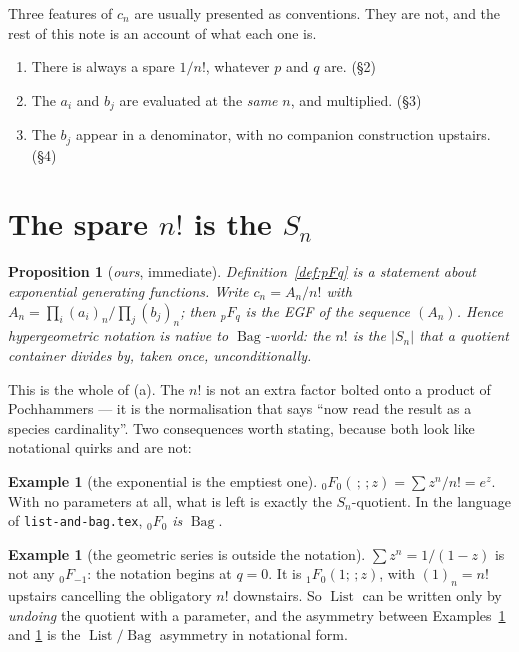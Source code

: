 \documentclass[11pt,a4paper]{article}
\newtheorem{proposition}[theorem]{Proposition}
\theoremstyle{definition}
\newtheorem{example}[theorem]{Example}
\theoremstyle{remark}
\newcommand{\norm}[1]{\lvert #1 \rvert}
\DeclareMathOperator{\List}{List}
\DeclareMathOperator{\Bag}{Bag}
\begin{document}
Three features of $c_n$ are usually presented as conventions. They are not, and the
rest of this note is an account of what each one is.

\begin{enumerate}[nosep,label=(\alph*)]
  \item There is always a spare $1/n!$, whatever $p$ and $q$ are. \hfill(\S2)
  \item The $a_i$ and $b_j$ are evaluated at the \emph{same} $n$, and multiplied.
        \hfill(\S3)
  \item The $b_j$ appear in a denominator, with no companion construction upstairs.
        \hfill(\S4)
\end{enumerate}

\section{The spare $n!$ is the $S_n$}

\begin{proposition}[\emph{ours}, immediate]\label{prop:native}
Definition~\ref{def:pFq} is a statement about exponential generating functions. Write
$c_n = A_n/n!$ with $A_n = \prod_i (a_i)_n / \prod_j (b_j)_n$; then ${}_pF_q$ is the
EGF of the sequence $(A_n)$. Hence hypergeometric notation is native to
$\Bag$-world: the $n!$ is the $\norm{S_n}$ that a quotient container divides by, taken
once, unconditionally.
\end{proposition}

This is the whole of (a). The $n!$ is not an extra factor bolted onto a product of
Pochhammers --- it is the normalisation that says ``now read the result as a species
cardinality''. Two consequences worth stating, because both look like notational
quirks and are not:

\begin{example}[the exponential is the emptiest one]\label{ex:exp}
${}_0F_0(\,;\,;z) = \sum z^n/n! = e^z$. With no parameters at all, what is left is
exactly the $S_n$-quotient. In the language of \texttt{list-and-bag.tex}, ${}_0F_0$
\emph{is} $\Bag$.
\end{example}

\begin{example}[the geometric series is outside the notation]\label{ex:geo}
$\sum z^n = 1/(1-z)$ is not any ${}_0F_{-1}$: the notation begins at $q = 0$. It is
${}_1F_0(1;\,;z)$, with $(1)_n = n!$ upstairs cancelling the obligatory $n!$
downstairs. So $\List$ can be written only by \emph{undoing} the quotient with a
parameter, and the asymmetry between Examples~\ref{ex:exp} and \ref{ex:geo} is the
$\List/\Bag$ asymmetry in notational form.
\end{example}
\end{document}
